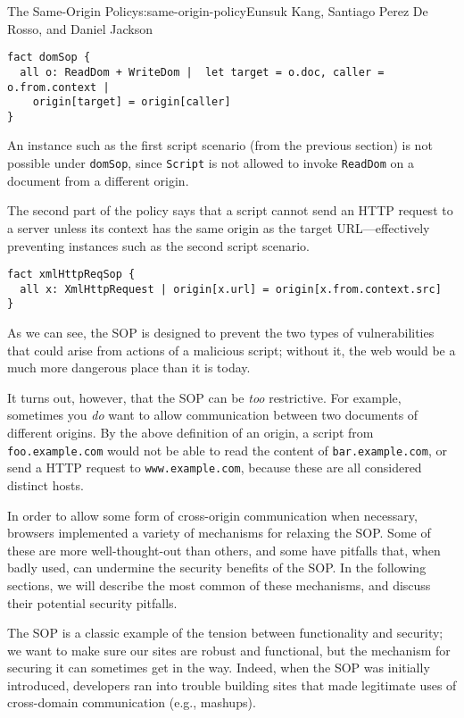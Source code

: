 \begin{aosachapter}{The Same-Origin Policy}{s:same-origin-policy}{Eunsuk Kang, Santiago Perez De Rosso, and Daniel Jackson}
\begin{verbatim}
fact domSop {
  all o: ReadDom + WriteDom |  let target = o.doc, caller = o.from.context |
    origin[target] = origin[caller] 
}
\end{verbatim}

An instance such as the first script scenario (from the previous
section) is not possible under \texttt{domSop}, since \texttt{Script} is
not allowed to invoke \texttt{ReadDom} on a document from a different
origin.

The second part of the policy says that a script cannot send an HTTP
request to a server unless its context has the same origin as the target
URL---effectively preventing instances such as the second script
scenario.

\begin{verbatim}
fact xmlHttpReqSop { 
  all x: XmlHttpRequest | origin[x.url] = origin[x.from.context.src] 
}
\end{verbatim}

As we can see, the SOP is designed to prevent the two types of
vulnerabilities that could arise from actions of a malicious script;
without it, the web would be a much more dangerous place than it is
today.

It turns out, however, that the SOP can be \emph{too} restrictive. For
example, sometimes you \emph{do} want to allow communication between two
documents of different origins. By the above definition of an origin, a
script from \texttt{foo.example.com} would not be able to read the
content of \texttt{bar.example.com}, or send a HTTP request to
\texttt{www.example.com}, because these are all considered distinct
hosts.

In order to allow some form of cross-origin communication when
necessary, browsers implemented a variety of mechanisms for relaxing the
SOP. Some of these are more well-thought-out than others, and some have
pitfalls that, when badly used, can undermine the security benefits of
the SOP. In the following sections, we will describe the most common of
these mechanisms, and discuss their potential security pitfalls.

\label{techniques-for-bypassing-the-sop}

The SOP is a classic example of the tension between functionality and
security; we want to make sure our sites are robust and functional, but
the mechanism for securing it can sometimes get in the way. Indeed, when
the SOP was initially introduced, developers ran into trouble building
sites that made legitimate uses of cross-domain communication (e.g.,
mashups).


\end{aosachapter}

